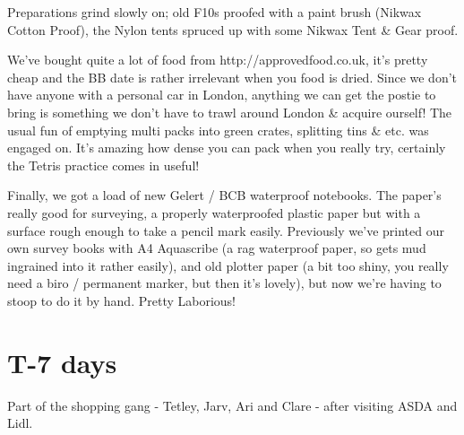 Preparations grind slowly on; old F10s proofed with a paint brush
(Nikwax Cotton Proof), the Nylon tents spruced up with some Nikwax
Tent \& Gear proof.

We’ve bought quite a lot of food from http://approvedfood.co.uk, it’s
pretty cheap and the BB date is rather irrelevant when you food is
dried. Since we don’t have anyone with a personal car in London,
anything we can get the postie to bring is something we don’t have to
trawl around London \& acquire ourself! The usual fun of emptying multi
packs into green crates, splitting tins \& etc. was engaged on. It’s
amazing how dense you can pack when you really try, certainly the
Tetris practice comes in useful!

Finally, we got a load of new Gelert / BCB waterproof notebooks.
The paper’s really good for surveying, a properly waterproofed plastic
paper but with a surface rough enough to take a pencil mark easily.
Previously we’ve printed our own survey books with A4 Aquascribe
(a rag waterproof paper, so gets mud ingrained into it rather easily),
and old plotter paper (a bit too shiny, you really need a biro /
permanent marker, but then it's lovely), but now we’re having to stoop
to do it by hand. Pretty Laborious! 

\newpage

\section{T-7 days}


\begin{marginfigure}
\checkoddpage \ifoddpage \forcerectofloat \else \forceversofloat \fi
\centering
 \caption{Part of the shopping gang - Tetley, Jarv, Ari and Clare - after visiting ASDA and Lidl. }
 \label{food 2011}
\end{marginfigure}

